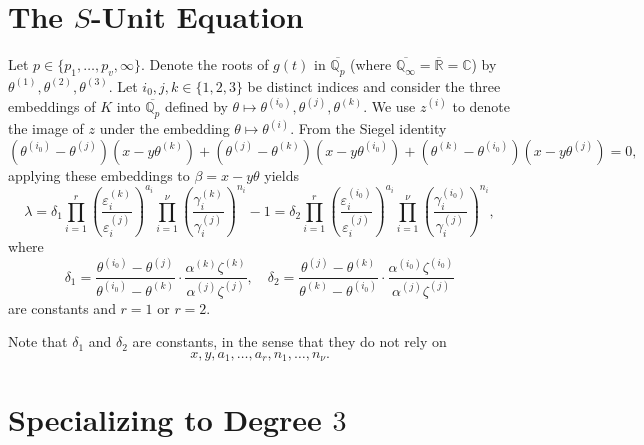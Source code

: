 \section{The $S$-Unit Equation}

Let $p \in \{p_1, \dots, p_v, \infty\}$. Denote the roots of $g(t)$ in $\overline{\mathbb{Q}_p}$ (where $\overline{\mathbb{Q}_{\infty}} = \overline{\mathbb{R}} = \mathbb{C}$) by $\theta^{(1)}, \theta^{(2)}, \theta^{(3)}$. Let $i_0, j, k \in \{1,2,3\}$ be distinct indices and consider the three embeddings of $K$ into $\overline{\mathbb{Q}_p}$ defined by $\theta \mapsto \theta^{(i_0)}, \theta^{(j)}, \theta^{(k)}$. We use $z^{(i)}$ to denote the image of $z$ under the embedding $\theta \mapsto \theta^{(i)}$. From the Siegel identity
\[\left(\theta^{(i_0)} - \theta^{(j)}\right)\left(x-y\theta^{(k)}\right) + \left(\theta^{(j)} - \theta^{(k)}\right)\left(x-y\theta^{(i_0)}\right) + \left(\theta^{(k)} - \theta^{(i_0)}\right)\left(x-y\theta^{(j)}\right) = 0,\]
applying these embeddings to $\beta = x-y\theta$ yields
\begin{equation}\label{Eq:Sunit}
\lambda = \delta_1 \prod_{i = 1}^r\left( \frac{\varepsilon_i^{(k)}}{\varepsilon_i^{(j)}}\right)^{a_i}\prod_{i = 1}^{\nu} \left( \frac{\gamma_i^{(k)}}{\gamma_i^{(j)}}\right)^{n_i} - 1 = \delta_2 \prod_{i = 1}^{r}\left( \frac{\varepsilon_i^{(i_0)}}{\varepsilon_i^{(j)}}\right)^{a_i} \prod_{i = 1}^{\nu} \left( \frac{\gamma_i^{(i_0)}}{\gamma_i^{(j)}}\right)^{n_i},
\end{equation}
where
\[\delta_1 = \frac{\theta^{(i_0)} - \theta^{(j)}}{\theta^{(i_0)} - \theta^{(k)}}\cdot\frac{\alpha^{(k)}\zeta^{(k)}}{\alpha^{(j)}\zeta^{(j)}}, \quad \delta_2 = \frac{\theta^{(j)} - \theta^{(k)}}{\theta^{(k)} - \theta^{(i_0)}}\cdot \frac{\alpha^{(i_0)}\zeta^{(i_0)}}{\alpha^{(j)}\zeta^{(j)}}\]
are constants and $r = 1$ or $r = 2$. 

Note that $\delta_1$ and $\delta_2$ are constants, in the sense that they do not rely on 
\[x, y, a_1, \dots, a_r,n_1, \dots, n_{\nu}.\]


\section{Specializing to Degree $3$}


